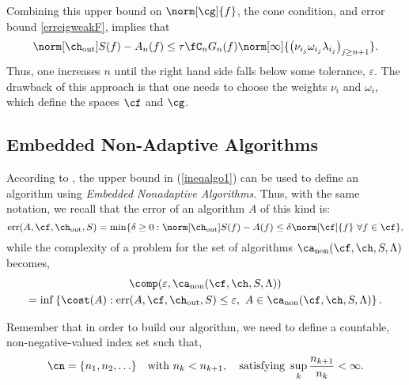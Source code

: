 \documentclass[final]{elsarticle}
\newcommand{\chout}{\ch_{\text{\rm{out}}}}
\DeclareMathOperator{\err}{err}
\DeclareMathOperator{\non}{non}
\theoremstyle{definition}
\theoremstyle{remark}
\begin{document}
Combining this upper bound on $\norm[\cg]{f}$, the cone condition, and error bound \eqref{erreigweakF}, implies that
\begin{equation}\label{ineqalgo1}
\norm[\chout]{S(f)-A_n(f)} \le \tau \fC_n G_n(f) \norm[\infty]{\left(\nu_{i_j} \omega_{i_j} \lambda_{i_j} \right)_{j\ge n+1}}.
\end{equation}
Thus, one increases $n$ until the right hand side falls below some tolerance, $\varepsilon$.  The drawback of this approach is that one needs to choose the weights $\nu_i$ and $\omega_i$, which define the spaces $\cf$ and $\cg$.

\subsection{Embedded Non-Adaptive Algorithms}

According to \cite{HicEtal14b}, the upper bound in (\ref{ineqalgo1}) can be used to define an algorithm using \textit{Embedded Nonadaptive Algorithms}. Thus, with the same notation, we recall that the error of an algorithm $A$ of this kind is:
\begin{equation} \label{errdefworst}
\err(A,\cf,\chout,S)
= \min\{ \delta \ge 0 : \norm[\chout]{S(f) -  A(f)} \le \delta \norm[\cf]{f} \ \forall f \in \cf \},
\end{equation}
while the complexity of a problem for the set of algorithms $\ca_{\non}(\cf,\ch,S,\Lambda)$ becomes,
\begin{multline} \label{fixcostcomplex}
\comp(\varepsilon,\ca_{\non}(\cf,\ch,S,\Lambda)) \\
= \inf\left\{\cost(A) : \err(A,\cf,\chout,S) \le \varepsilon, \ A \in \ca_{\non}(\cf,\ch,S,\Lambda) \right \}.
\end{multline}

Remember that in order to build our algorithm, we need to define a countable, non-negative-valued index set such that,
\begin{equation} \label{indexdef}
\cn=\{n_1, n_2, \ldots\} \quad \text{with } n_k < n_{k+1}, \quad \text{satisfying } \sup_k \frac{n_{k+1}}{n_k} <\infty.
\end{equation}
\end{document}
